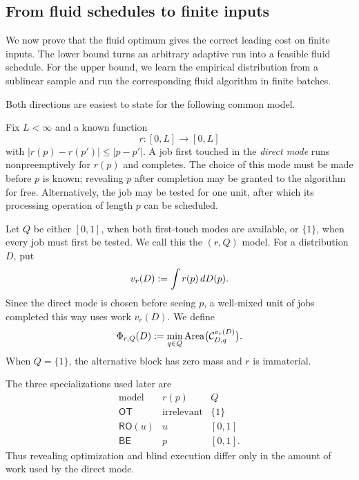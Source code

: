 \subsection{From fluid schedules to finite inputs}
\label{sec:common-finite-transfer}

We now prove that the fluid optimum gives the correct leading cost on finite
inputs.  The lower bound turns an arbitrary adaptive run into a feasible
fluid schedule.  For the upper bound, we learn the empirical distribution
from a sublinear sample and run the corresponding fluid algorithm in finite
batches.

Both directions are easiest to state for the following common model.

Fix $L<\infty$ and a known function
\[
 r:[0,L]\longrightarrow[0,L]
\]
with $|r(p)-r(p')|\le|p-p'|$.  A job first touched in the \emph{direct mode}
runs nonpreemptively for $r(p)$ and completes.  The choice of this mode must
be made before $p$ is known; revealing $p$ after completion may be granted
to the algorithm for free.  Alternatively, the job may be tested for one
unit, after which its processing operation of length $p$ can be scheduled.

Let $Q$ be either $[0,1]$, when both first-touch modes are available, or
$\{1\}$, when every job must first be tested.  We call this the $(r,Q)$
model.  For a distribution $D$, put
\begin{equation}
 v_r(D)\mathrel{:=}\int r(p)\,dD(p).
 \label{eq:common-direct-mean}
\end{equation}
Since the direct mode is chosen before seeing $p$, a well-mixed unit of jobs
completed this way uses work $v_r(D)$.  We define
\begin{equation}
 \Phi_{r,Q}(D)\mathrel{:=}
 \min_{q\in Q}\operatorname{Area}\bigl(\mathcal C^{v_r(D)}_{D,q}\bigr).
 \label{eq:common-instance-benchmark}
\end{equation}
When $Q=\{1\}$, the alternative block has zero mass and $r$ is immaterial.

The three specializations used later are
\begin{equation}
 \begin{array}{c|c|c}
  \text{model}&r(p)&Q\\
  \hline
  \mathsf{OT}&\text{irrelevant}&\{1\}\\
  \mathsf{RO}(u)&u&[0,1]\\
  \mathsf{BE}&p&[0,1].
 \end{array}
 \label{eq:common-instance-specializations}
\end{equation}
Thus revealing optimization and blind execution differ only in the amount
of work used by the direct mode.

